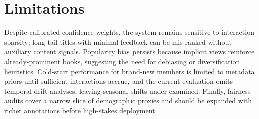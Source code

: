 \section{Limitations}
Despite calibrated confidence weights, the system remains sensitive to interaction sparsity; long-tail titles with minimal feedback can be mis-ranked without auxiliary content signals. Popularity bias persists because implicit views reinforce already-prominent books, suggesting the need for debiasing or diversification heuristics. Cold-start performance for brand-new members is limited to metadata priors until sufficient interactions accrue, and the current evaluation omits temporal drift analyses, leaving seasonal shifts under-examined. Finally, fairness audits cover a narrow slice of demographic proxies and should be expanded with richer annotations before high-stakes deployment.

